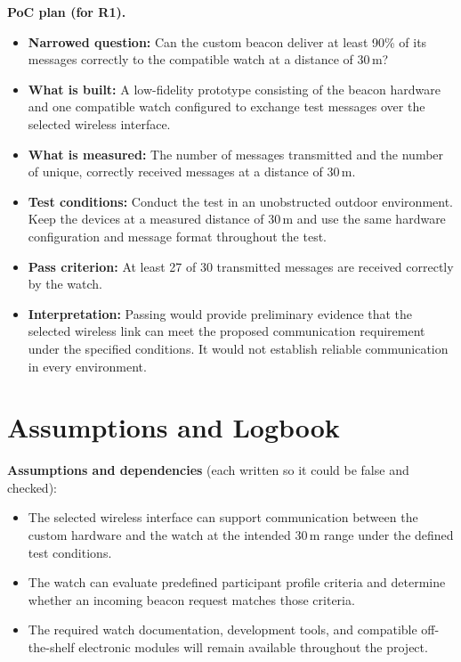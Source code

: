 \documentclass[10pt]{article}
\begin{document}
\textbf{PoC plan (for R1).}
\begin{itemize}
  \item \textbf{Narrowed question:}
  Can the custom beacon deliver at least 90\% of its messages
  correctly to the compatible watch at a distance of 30\,m?

  \item \textbf{What is built:}
  A low-fidelity prototype consisting of the beacon hardware
  and one compatible watch configured to exchange test messages
  over the selected wireless interface.

  \item \textbf{What is measured:}
  The number of messages transmitted and the number of unique,
  correctly received messages at a distance of 30\,m.

  \item \textbf{Test conditions:}
  Conduct the test in an unobstructed outdoor environment.
  Keep the devices at a measured distance of 30\,m and use
  the same hardware configuration and message format throughout
  the test.

  \item \textbf{Pass criterion:}
  At least 27 of 30 transmitted messages are received correctly
  by the watch.

  \item \textbf{Interpretation:}
  Passing would provide preliminary evidence that the selected
  wireless link can meet the proposed communication requirement
  under the specified conditions. It would not establish
  reliable communication in every environment.
\end{itemize}

\section{Assumptions and Logbook}

\textbf{Assumptions and dependencies}
(each written so it could be false and checked):
\begin{itemize}
  \item The selected wireless interface can support communication
  between the custom hardware and the watch at the intended
  30\,m range under the defined test conditions.

  \item The watch can evaluate predefined participant profile
  criteria and determine whether an incoming beacon request
  matches those criteria.

  \item The required watch documentation, development tools,
  and compatible off-the-shelf electronic modules will remain
  available throughout the project.
\end{itemize}
\end{document}
